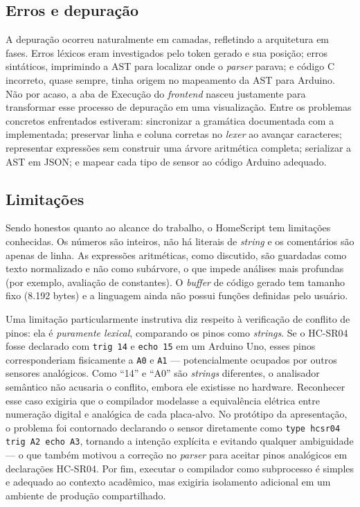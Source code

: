 \documentclass[conference]{IEEEtran}
\begin{document}
\subsection{Erros e depuração}

A depuração ocorreu naturalmente em camadas, refletindo a arquitetura em
fases. Erros léxicos eram investigados pelo token gerado e sua posição;
erros sintáticos, imprimindo a AST para localizar onde o \emph{parser}
parava; e código C incorreto, quase sempre, tinha origem no mapeamento da
AST para Arduino. Não por acaso, a aba de Execução do \emph{frontend}
nasceu justamente para transformar esse processo de depuração em uma
visualização. Entre os problemas concretos enfrentados estiveram:
sincronizar a gramática documentada com a implementada; preservar linha e
coluna corretas no \emph{lexer} ao avançar caracteres; representar
expressões sem construir uma árvore aritmética completa; serializar a AST
em JSON; e mapear cada tipo de sensor ao código Arduino adequado.

\subsection{Limitações}
\label{subsec:limitacoes}

Sendo honestos quanto ao alcance do trabalho, o HomeScript tem limitações
conhecidas. Os números são inteiros, não há literais de \emph{string} e os
comentários são apenas de linha. As expressões aritméticas, como
discutido, são guardadas como texto normalizado e não como subárvore, o
que impede análises mais profundas (por exemplo, avaliação de constantes).
O \emph{buffer} de código gerado tem tamanho fixo (8.192 bytes) e a
linguagem ainda não possui funções definidas pelo usuário.

Uma limitação particularmente instrutiva diz respeito à verificação de
conflito de pinos: ela é \emph{puramente lexical}, comparando os pinos como
\emph{strings}. Se o HC-SR04 fosse declarado com \texttt{trig 14} e
\texttt{echo 15} em um Arduino Uno, esses pinos corresponderiam fisicamente
a \texttt{A0} e \texttt{A1} --- potencialmente ocupados por outros sensores
analógicos. Como ``14'' e ``A0'' são \emph{strings} diferentes, o analisador
semântico não acusaria o conflito, embora ele existisse no hardware.
Reconhecer esse caso exigiria que o compilador modelasse a equivalência
elétrica entre numeração digital e analógica de cada placa-alvo. No protótipo
da apresentação, o problema foi contornado declarando o sensor diretamente
como \texttt{type hcsr04 trig A2 echo A3}, tornando a intenção explícita e
evitando qualquer ambiguidade --- o que também motivou a correção no
\emph{parser} para aceitar pinos analógicos em declarações HC-SR04. Por fim, executar o compilador como subprocesso é
simples e adequado ao contexto acadêmico, mas exigiria isolamento adicional
em um ambiente de produção compartilhado.
\end{document}
